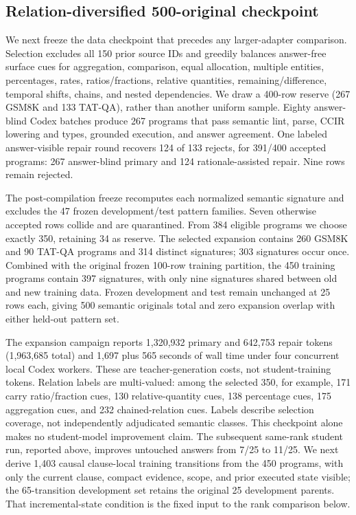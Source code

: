 \documentclass[11pt]{article}
\begin{document}
\subsection{Relation-diversified 500-original checkpoint}

We next freeze the data checkpoint that precedes any larger-adapter comparison.
Selection excludes all 150 prior source IDs and greedily balances answer-free
surface cues for aggregation, comparison, equal allocation, multiple entities,
percentages, rates, ratios/fractions, relative quantities,
remaining/difference, temporal shifts, chains, and nested dependencies. We draw
a 400-row reserve (267 GSM8K and 133 TAT-QA), rather than another uniform sample.
Eighty answer-blind Codex batches produce 267 programs that pass semantic lint,
parse, CCIR lowering and types, grounded execution, and answer agreement. One
labeled answer-visible repair round recovers 124 of 133 rejects, for 391/400
accepted programs: 267 answer-blind primary and 124 rationale-assisted repair.
Nine rows remain rejected.

The post-compilation freeze recomputes each normalized semantic signature and
excludes the 47 frozen development/test pattern families. Seven otherwise
accepted rows collide and are quarantined. From 384 eligible programs we choose
exactly 350, retaining 34 as reserve. The selected expansion contains 260 GSM8K
and 90 TAT-QA programs and 314 distinct signatures; 303 signatures occur once.
Combined with the original frozen 100-row training partition, the 450 training
programs contain 397 signatures, with only nine signatures shared between old
and new training data. Frozen development and test remain unchanged at 25 rows
each, giving 500 semantic originals total and zero expansion overlap with either
held-out pattern set.

The expansion campaign reports 1,320,932 primary and 642,753 repair tokens
(1,963,685 total) and 1,697 plus 565 seconds of wall time under four concurrent
local Codex workers. These are teacher-generation costs, not student-training
tokens. Relation labels are multi-valued: among the selected 350, for example,
171 carry ratio/fraction cues, 130 relative-quantity cues, 138 percentage cues,
175 aggregation cues, and 232 chained-relation cues. Labels describe selection
coverage, not independently adjudicated semantic classes. This checkpoint alone
makes no student-model improvement claim. The subsequent same-rank student run,
reported above, improves untouched answers from 7/25 to 11/25. We next derive
1,403 causal clause-local training transitions from the 450 programs, with only
the current clause, compact evidence, scope, and prior executed state visible;
the 65-transition development set retains the original 25 development parents.
That incremental-state condition is the fixed input to the rank comparison below.
\end{document}
